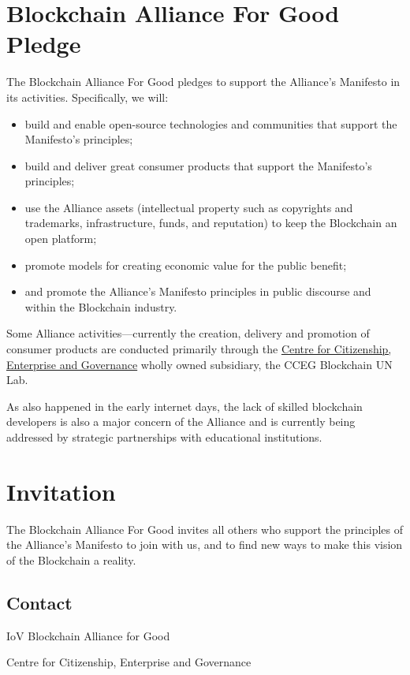 \documentclass[twoside,twocolumn]{article}
\begin{document}
\section{Blockchain Alliance For Good Pledge}
The Blockchain Alliance For Good pledges to support the Alliance's Manifesto in
its activities. Specifically, we will:

\begin{itemize}
  \item build and enable open-source technologies and communities that support
  the Manifesto’s principles;
  \item build and deliver great consumer products that support the Manifesto’s
  principles;
  \item use the Alliance assets (intellectual property such as copyrights and
  trademarks, infrastructure, funds, and reputation) to keep the Blockchain an
  open platform;
  \item promote models for creating economic value for the public benefit;
  \item and promote the Alliance's Manifesto principles in public discourse and
  within the Blockchain industry.
\end{itemize}

Some Alliance activities—currently the creation, delivery and promotion of
consumer products are conducted primarily through the
\href{www.cceg.org.uk}{Centre for Citizenship, Enterprise and Governance} wholly
owned subsidiary, the CCEG Blockchain UN Lab.

As also happened in the early internet days, the lack of skilled
blockchain developers is also a major concern of the Alliance and is currently
being addressed by strategic partnerships with educational institutions.

\section{Invitation}

The Blockchain Alliance For Good invites all others who support the principles of the
Alliance's Manifesto to join with us, and to find new ways to make this vision
of the Blockchain a reality.

\subsection{Contact}

IoV Blockchain Alliance for Good

Centre for Citizenship, Enterprise and Governance
\end{document}
